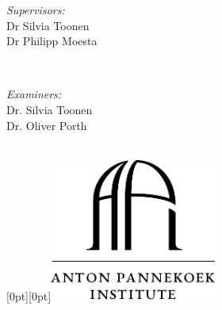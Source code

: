 \begin{titlepage}

\begin{minipage}{0.4\textwidth}
\begin{flushleft} \large
{\large \emph{Supervisors:}}\\

\large{Dr Silvia Toonen}\\ %
\large{Dr Philipp Moesta}
\end{flushleft}
\end{minipage}
~
\begin{minipage}{0.4\textwidth}
\begin{flushright} \large
\emph{Examiners:} \\
\large{Dr. Silvia Toonen} \\
\large{Dr. Oliver Porth} %
\end{flushright}
\end{minipage}\\



\raisebox{-138pt}[0pt][0pt]{\includegraphics[width=5.5cm]{Thesis/logos/api_logo.pdf}}\\ %




\vfill 

\end{titlepage}

\newpage

\mbox{}


\newpage
{}
\setcounter{page}{1}
{
  \hypersetup{linkcolor=black}
\tableofcontents

\newpage
\thispagestyle{empty}
\mbox{}

\listoffigures

\newpage
\thispagestyle{empty}
\mbox{}

\listoftables


\mbox{}
\thispagestyle{empty}
\printacronyms[include-classes=abbrev,name=List of Abbreviations]
}


